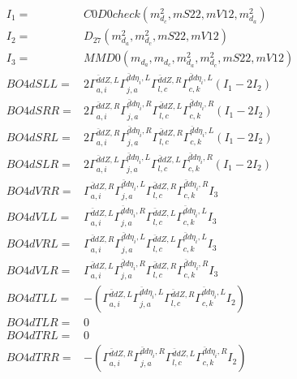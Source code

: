 \documentclass[A4,landscape]{article}
\begin{document}
\begin{align} 
I_1 = & C0D0check(m^2_{d_{{c}}}, mS22, mV12, m^2_{d_{{a}}}) \\ 
I_2 = & D_{27}(m^2_{d_{{a}}}, m^2_{d_{{c}}}, mS22, mV12) \\ 
I_3 = & MMD0(m_{d_{{a}}}, m_{d_{{c}}}, m^2_{d_{{a}}}, m^2_{d_{{c}}}, mS22, mV12) \\ 
  BO4dSLL= & 2  \Gamma^{\bar{d}d Z ,L}_{a, i} \Gamma^{\bar{d}d \eta_i ,L}_{j, a} \Gamma^{\bar{d}d Z ,R}_{l, c} \Gamma^{\bar{d}d \eta_i ,L}_{c, k} (I_1 - 2 I_2) \\ 
  BO4dSRR= & 2  \Gamma^{\bar{d}d Z ,R}_{a, i} \Gamma^{\bar{d}d \eta_i ,R}_{j, a} \Gamma^{\bar{d}d Z ,L}_{l, c} \Gamma^{\bar{d}d \eta_i ,R}_{c, k} (I_1 - 2 I_2) \\ 
  BO4dSRL= & 2  \Gamma^{\bar{d}d Z ,R}_{a, i} \Gamma^{\bar{d}d \eta_i ,R}_{j, a} \Gamma^{\bar{d}d Z ,R}_{l, c} \Gamma^{\bar{d}d \eta_i ,L}_{c, k} (I_1 - 2 I_2) \\ 
  BO4dSLR= & 2  \Gamma^{\bar{d}d Z ,L}_{a, i} \Gamma^{\bar{d}d \eta_i ,L}_{j, a} \Gamma^{\bar{d}d Z ,L}_{l, c} \Gamma^{\bar{d}d \eta_i ,R}_{c, k} (I_1 - 2 I_2) \\ 
  BO4dVRR= &  \Gamma^{\bar{d}d Z ,R}_{a, i} \Gamma^{\bar{d}d \eta_i ,L}_{j, a} \Gamma^{\bar{d}d Z ,R}_{l, c} \Gamma^{\bar{d}d \eta_i ,R}_{c, k} I_3 \\ 
  BO4dVLL= &  \Gamma^{\bar{d}d Z ,L}_{a, i} \Gamma^{\bar{d}d \eta_i ,R}_{j, a} \Gamma^{\bar{d}d Z ,L}_{l, c} \Gamma^{\bar{d}d \eta_i ,L}_{c, k} I_3 \\ 
  BO4dVRL= &  \Gamma^{\bar{d}d Z ,R}_{a, i} \Gamma^{\bar{d}d \eta_i ,L}_{j, a} \Gamma^{\bar{d}d Z ,L}_{l, c} \Gamma^{\bar{d}d \eta_i ,L}_{c, k} I_3 \\ 
  BO4dVLR= &  \Gamma^{\bar{d}d Z ,L}_{a, i} \Gamma^{\bar{d}d \eta_i ,R}_{j, a} \Gamma^{\bar{d}d Z ,R}_{l, c} \Gamma^{\bar{d}d \eta_i ,R}_{c, k} I_3 \\ 
  BO4dTLL= & -( \Gamma^{\bar{d}d Z ,L}_{a, i} \Gamma^{\bar{d}d \eta_i ,L}_{j, a} \Gamma^{\bar{d}d Z ,R}_{l, c} \Gamma^{\bar{d}d \eta_i ,L}_{c, k} I_2) \\ 
  BO4dTLR= & 0 \\ 
  BO4dTRL= & 0 \\ 
  BO4dTRR= & -( \Gamma^{\bar{d}d Z ,R}_{a, i} \Gamma^{\bar{d}d \eta_i ,R}_{j, a} \Gamma^{\bar{d}d Z ,L}_{l, c} \Gamma^{\bar{d}d \eta_i ,R}_{c, k} I_2) \\ 
\end{align} 
\end{document}
